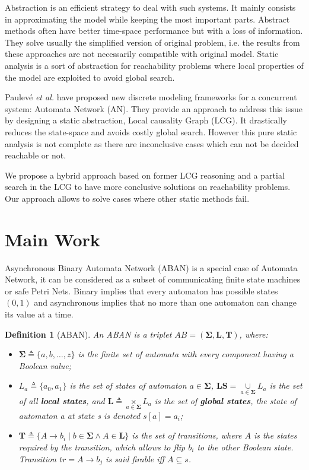 \documentclass[en]{jdoc}
\newtheorem{definition}{Definition}
\newcommand{\acm}[3]{#1\rightarrow#2}
\begin{document}
Abstraction is an efficient strategy to deal with such systems. 
It mainly consists in approximating the model while keeping the most important parts.
Abstract methods often have better time-space performance but with a loss of information. 
They solve usually the simplified version of original problem, i.e. the results from these approaches are not necessarily compatible with original model.
Static analysis is a sort of abstraction for reachability problems where local properties of the model are exploited to avoid global search. 

Paulev\'e \textit{et al.} \cite{folschette2015,pauleve2012} have proposed new discrete modeling frameworks for a concurrent system: Automata Network (AN).
They provide an approach to address this issue by designing a static abstraction, Local causality Graph (LCG). 
It drastically reduces the state-space and avoids costly global search. 
However this pure static analysis is not complete as there are inconclusive cases which can not be decided reachable or not.


We propose a hybrid approach based on former LCG reasoning and a partial search in the LCG to have more conclusive solutions on reachability problems. 
Our approach allows to solve cases where other static methods fail.
\section{Main Work}
Asynchronous Binary Automata Network (ABAN) is a special case of Automata Network, it can be considered as a subset of communicating finite state machines or safe Petri Nets. 
Binary implies that every automaton has possible states $(0,1)$ and asynchronous implies that no more than one automaton can change its value at a time.

\begin{definition}[ABAN]
An ABAN is a triplet $AB = (\mathbf{\Sigma},\mathbf{L},\mathbf{T})$, where:
\begin{itemize}
\item $\mathbf{\Sigma}\triangleq\{a,b,\ldots,z\}$ is the finite set of automata with every component having a Boolean value;
\item $L_a\triangleq\{a_0,a_1\}$ is the set of states of automaton $a\in \mathbf{\Sigma}$, $\mathbf{LS}=\underset{a\in \mathbf{\Sigma}}{\cup} L_a$ is the set of all \textbf{local states}, and $\mathbf{L}\triangleq \underset{a\in \mathbf{\Sigma}}{\times} L_a$ is the set of \textbf{global states}, the state of automaton a at state s is denoted $s[a]=a_i$;
\item $\mathbf{T}\triangleq \{A\rightarrow b_i\mid b\in \mathbf{\Sigma} \land A\in \mathbf{L}\}$ is the set of transitions, where $A$ is the states required by the transition, which allows to flip $b_i$ to the other Boolean state. Transition $tr=\acm{A}{b_j}{b_k}$ is said firable iff $A\subseteq s$.%
\end{itemize}
\end{definition}
\end{document}
